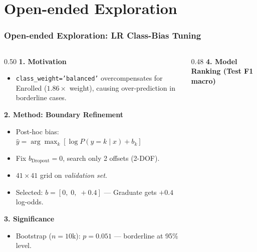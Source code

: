 \documentclass[aspectratio=169]{beamer}
\begin{document}
\section{Open-ended Exploration}
\begin{frame}
\frametitle{Open-ended Exploration: LR Class-Bias Tuning}

\begin{columns}[T]

    \begin{column}{0.50\textwidth}
        {\normalsize \textbf{\textcolor{mainblue}{1. Motivation}}}
        \begin{itemize}
            \scriptsize
            \setlength{\itemsep}{1pt}
            \item \texttt{class\_weight='balanced'} overcompensates for Enrolled ($1.86\times$ weight), causing over-prediction in borderline cases.
        \end{itemize}

        \vspace{0.1cm}
        {\normalsize \textbf{\textcolor{mainblue}{2. Method: Boundary Refinement}}}
        \begin{itemize}
            \scriptsize
            \setlength{\itemsep}{1pt}
            \item Post-hoc bias: $\hat{y} = \arg\max_k [\log P(y{=}k \mid x) + b_k]$
            \item Fix $b_{\text{Dropout}}{=}0$, search only 2 offsets (2-DOF).
            \item $41 \times 41$ grid on \textit{validation set}.
            \item Selected: $b = [0,\; 0,\; +0.4]$ — Graduate gets $+0.4$ log-odds.
        \end{itemize}

        \vspace{0.1cm}
        {\normalsize \textbf{\textcolor{mainblue}{3. Significance}}}
        \begin{itemize}
            \scriptsize
            \setlength{\itemsep}{1pt}
            \item Bootstrap ($n{=}10$k): $p = 0.051$ — borderline at 95\% level.
        \end{itemize}
    \end{column}

    \begin{column}{0.48\textwidth}
        {\normalsize \textbf{\textcolor{mainblue}{4. Model Ranking (Test F1 macro)}}}


\end{column}
\end{columns}
\end{frame}
\end{document}
